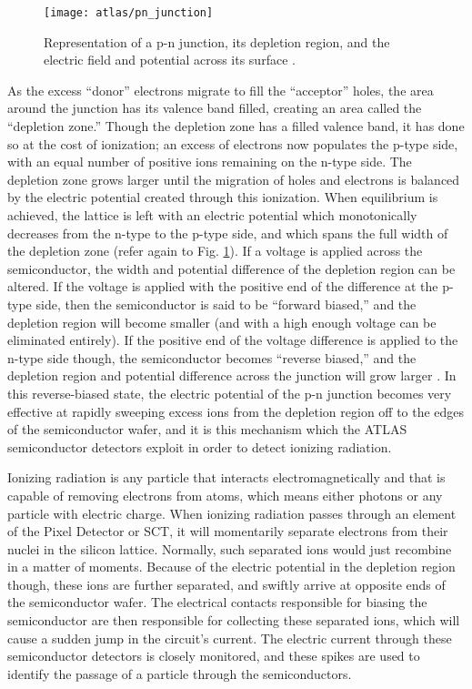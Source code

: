         \begin{figure} \centering
            \texttt{[image: atlas/pn\_junction]}
            \caption{Representation of a p-n junction, its depletion region,
                and the electric field and potential across its surface \cite{Havránek:2317324}.}
            \label{fig:pn_junction}
        \end{figure}

        As the excess ``donor'' electrons migrate to fill the ``acceptor'' holes, the area around the junction has its valence band filled, creating an area called the ``depletion zone.''
        Though the depletion zone has a filled valence band, it has done so at the cost of ionization; an excess of electrons now populates the p-type side, with an equal number of positive ions remaining on the n-type side.
        The depletion zone grows larger until the migration of holes and electrons is balanced by the electric potential created through this ionization.
        When equilibrium is achieved, the lattice is left with an electric potential which monotonically decreases from the n-type to the p-type side, and which spans the full width of the depletion zone (refer again to Fig. \ref{fig:pn_junction}).
        If a voltage is applied across the semiconductor, the width and potential difference of the depletion region can be altered.
        If the voltage is applied with the positive end of the difference at the p-type side, then the semiconductor is said to be ``forward biased,'' and the depletion region will become smaller (and with a high enough voltage can be eliminated entirely).
        If the positive end of the voltage difference is applied to the n-type side though, the semiconductor becomes ``reverse biased,'' and the depletion region and potential difference across the junction will grow larger \cite{wiley_radiation_detection}.
        In this reverse-biased state, the electric potential of the p-n junction becomes very effective
            at rapidly sweeping excess ions from the depletion region off to the edges of the semiconductor wafer,
            and it is this mechanism which the ATLAS semiconductor detectors exploit in order to detect ionizing radiation.

        Ionizing radiation is any particle that interacts electromagnetically and that is capable of removing electrons from atoms,
            which means either photons or any particle with electric charge.
        When ionizing radiation passes through an element of the Pixel Detector or SCT, it will momentarily separate electrons from their nuclei in the silicon lattice.
        Normally, such separated ions would just recombine in a matter of moments.
        Because of the electric potential in the depletion region though, these ions are further separated, and swiftly arrive at opposite ends of the semiconductor wafer.
        The electrical contacts responsible for biasing the semiconductor are then responsible for collecting these separated ions, which will cause a sudden jump in the circuit's current.
        The electric current through these semiconductor detectors is closely monitored, and these spikes are used to identify the passage of a particle through the semiconductors.


